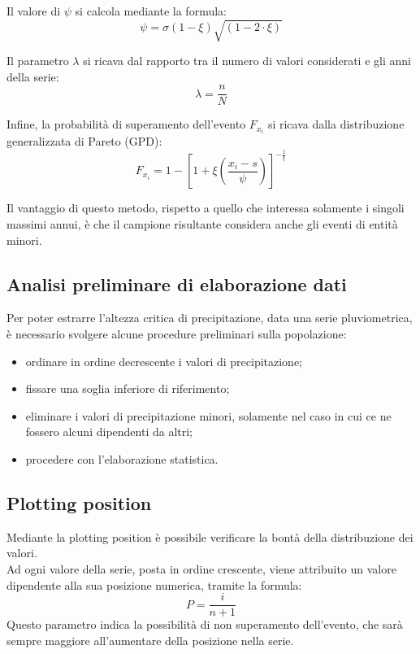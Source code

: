 Il valore di $\psi$ si calcola mediante la formula:
\begin{equation}
    \psi = \sigma(1-\xi) \sqrt{(1-2 \cdot \xi)}
\end{equation}

Il parametro $\lambda$ si ricava dal rapporto tra il numero di valori considerati e gli anni della serie:
\begin{equation}
    \lambda = \frac{n}{N}
\end{equation}

Infine, la probabilità di superamento dell'evento $F_{x_i}$ si ricava dalla distribuzione generalizzata di Pareto (GPD):
\begin{equation}
F_{x_i} = 1- \left[ 1+\xi\left(\frac{x_i - s}{\psi}\right)\right]^{-\frac{1}{\xi}}
\label{prob_non_super_pareto}
\end{equation}

Il vantaggio di questo metodo, rispetto a quello che interessa solamente i singoli massimi annui, è che il campione risultante considera anche gli eventi di entità minori.

\subsection{Analisi preliminare di elaborazione dati}
Per poter estrarre l'altezza critica di precipitazione, data una serie pluviometrica, è necessario svolgere alcune procedure preliminari sulla popolazione:
\begin{itemize}
    \item ordinare in ordine decrescente i valori di precipitazione;
    \item fissare una soglia inferiore di riferimento;
    \item eliminare i valori di precipitazione minori, solamente nel caso in cui ce ne fossero alcuni dipendenti da altri;
    \item procedere con l'elaborazione statistica.
\end{itemize}

\subsection{Plotting position}
Mediante la plotting position è possibile verificare la bontà della distribuzione dei valori.\\
Ad ogni valore della serie, posta in ordine crescente, viene attribuito un valore dipendente alla sua posizione numerica, tramite la formula:
\begin{equation}
   P= \frac{i}{n+1}
\end{equation}
Questo parametro indica la possibilità di non superamento dell'evento, che sarà sempre maggiore all'aumentare della posizione nella serie.

